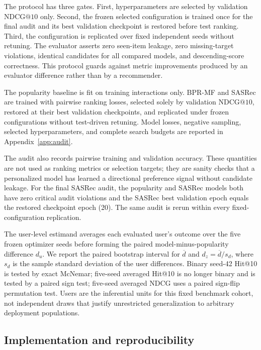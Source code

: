 \documentclass[review]{elsarticle}
\makeatletter
\theoremstyle{plain}
\theoremstyle{definition}
\theoremstyle{remark}
\newcommand{\NDCG}{\mathrm{NDCG@10}}
\makeatother
\begin{document}
The protocol has three gates. First, hyperparameters are selected by validation $\NDCG$ only. Second, the frozen selected configuration is trained once for the final audit and its best validation checkpoint is restored before test ranking. Third, the configuration is replicated over fixed independent seeds without retuning. The evaluator asserts zero seen-item leakage, zero missing-target violations, identical candidates for all compared models, and descending-score correctness. This protocol guards against metric improvements produced by an evaluator difference rather than by a recommender.

The popularity baseline is fit on training interactions only. BPR-MF \cite{rendle2009bpr} and SASRec \cite{kang2018sasrec} are trained with pairwise ranking losses, selected solely by validation $\NDCG$, restored at their best validation checkpoints, and replicated under frozen configurations without test-driven retuning. Model losses, negative sampling, selected hyperparameters, and complete search budgets are reported in Appendix~\ref{app:audit}.

The audit also records pairwise training and validation accuracy. These quantities are not used as ranking metrics or selection targets; they are sanity checks that a personalized model has learned a directional preference signal without candidate leakage. For the final SASRec audit, the popularity and SASRec models both have zero critical audit violations and the SASRec best validation epoch equals the restored checkpoint epoch (20). The same audit is rerun within every fixed-configuration replication.

The user-level estimand averages each evaluated user's outcome over the five frozen optimizer seeds before forming the paired model-minus-popularity difference $d_u$. We report the paired bootstrap interval for $\overline d$ and $d_z=\overline d/s_d$, where $s_d$ is the sample standard deviation of the user differences. Binary seed-42 Hit@10 is tested by exact McNemar; five-seed averaged Hit@10 is no longer binary and is tested by a paired sign test; five-seed averaged NDCG uses a paired sign-flip permutation test. Users are the inferential units for this fixed benchmark cohort, not independent draws that justify unrestricted generalization to arbitrary deployment populations.

\subsection{Implementation and reproducibility}
\end{document}
